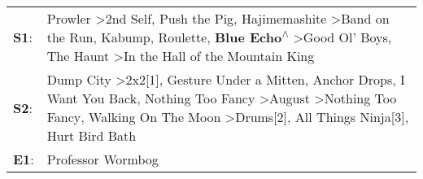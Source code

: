 \begin{supertabular}{p{0.03\textwidth}p{0.92\textwidth}}
 \textbf{S1}:  &                                              Prowler\textsuperscript{} \textgreater \enspace 2nd Self\textsuperscript{}, \enspace Push the Pig\textsuperscript{}, \enspace Hajimemashite\textsuperscript{} \textgreater \enspace Band on the Run\textsuperscript{}, \enspace Kabump\textsuperscript{}, \enspace Roulette\textsuperscript{}, \enspace \textbf{Blue Echo\textsuperscript{$\wedge$}} \textgreater \enspace Good Ol' Boys\textsuperscript{}, \enspace The Haunt\textsuperscript{} \textgreater \enspace In the Hall of the Mountain King\textsuperscript{}  \enspace  \\
 \textbf{S2}:  &  Dump City\textsuperscript{} \textgreater \enspace 2x2[1]\textsuperscript{}, \enspace Gesture Under a Mitten\textsuperscript{}, \enspace Anchor Drops\textsuperscript{}, \enspace I Want You Back\textsuperscript{}, \enspace Nothing Too Fancy\textsuperscript{} \textgreater \enspace August\textsuperscript{} \textgreater \enspace Nothing Too Fancy\textsuperscript{}, \enspace Walking On The Moon\textsuperscript{} \textgreater \enspace Drums[2]\textsuperscript{}, \enspace All Things Ninja[3]\textsuperscript{}, \enspace Hurt Bird Bath\textsuperscript{}  \enspace  \\
 \textbf{E1}:  &                                                                                                                                                                                                                                                                                                                                                                                                                                                                                                                                    Professor Wormbog\textsuperscript{}  \enspace  \\
\end{supertabular}
